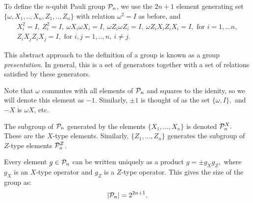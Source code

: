\documentclass[12pt,notitlepage,longbibliography,nofootinbib,tightenlines]{revtex4}
\begin{document}
To define the $n$-qubit Pauli group $\mathcal{P}_n$, 
we use the $2n+1$ element 
generating set $\{\omega , X_1, .., X_n, Z_1, .., Z_n\}$
with relation $\omega^2=I$ as before, and
\begin{equation}\label{presentation}
\begin{array}{c}
X_i^2=I,\ Z_i^2=I,\ \omega X_i\omega X_i=I,\ \omega Z_i\omega Z_i=I,\ \omega Z_iX_iZ_iX_i=I, 
\mbox{\ for\ } i=1,...n,\\
Z_iX_jZ_iX_j=I, \mbox{\ for\ } i, j = 1,..,n,\ i\ne j.
\end{array}
\end{equation}

This abstract approach to the definition of a group is known as
a group {\it presentation}. In general, this is a set of
generators together with a set of relations satisfied
by these generators.

Note that $\omega$ commutes with all elements of $\mathcal{P}_n$
and squares to the idenity, so we will denote this
element as $-1.$ Similarly, $\pm 1$ is thought of as the
set $\{\omega, I\},$ and $-X$ is $\omega X$, etc.

The subgroup of $\mathcal{P}_n$ generated by
the elements $\{X_1,...,X_n\}$ %
is denoted $\mathcal{P}_n^X.$ These are the $X$-type
elements. Similarly,
 $\{Z_1,...,Z_n\}$ generates %
the subgroup of $Z$-type elements $\mathcal{P}_n^Z$.

Every element $g\in\mathcal{P}_n$ can be written
uniquely as a product $g = \pm g_X g_Z,$
where $g_X$ is an $X$-type operator and $g_Z$
is a $Z$-type operator.
This gives the size of the group as:
$$
    |\mathcal{P}_n| = 2^{2n+1}.
$$
\end{document}

